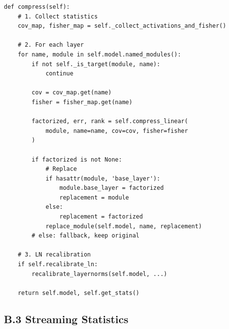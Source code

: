 \begin{lstlisting}
def compress(self):
    # 1. Collect statistics
    cov_map, fisher_map = self._collect_activations_and_fisher()
    
    # 2. For each layer
    for name, module in self.model.named_modules():
        if not self._is_target(module, name):
            continue
        
        cov = cov_map.get(name)
        fisher = fisher_map.get(name)
        
        factorized, err, rank = self.compress_linear(
            module, name=name, cov=cov, fisher=fisher
        )
        
        if factorized is not None:
            # Replace
            if hasattr(module, 'base_layer'):
                module.base_layer = factorized
                replacement = module
            else:
                replacement = factorized
            replace_module(self.model, name, replacement)
        # else: fallback, keep original
    
    # 3. LN recalibration
    if self.recalibrate_ln:
        recalibrate_layernorms(self.model, ...)
    
    return self.model, self.get_stats()
\end{lstlisting}

\subsection{B.3 Streaming Statistics}

